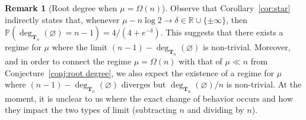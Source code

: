 \documentclass{article}
\newcommand{\pr}{\mathbb{P}}								%
\newcommand{\Prob}[1]{\pr\left(#1\right)}					%
\newcommand{\1}{\mathbbm{1}}								%
\theoremstyle{definition}
\newtheorem{remark}[theorem]{Remark}
\numberwithin{equation}{section}
\newcommand{\R}{\mathbb R}
\begin{document}
\begin{remark}[Root degree when $\mu =\Omega(n)$]
    Observe that Corollary~\ref{cor:star} indirectly states that, whenever $\mu-n \log 2 \to \delta \in \R \cup \{\pm\infty\}$, then $\Prob{\deg_{\mathbf{T}_n}(\varnothing)=n-1}=4/(4+e^{-\delta})$.
    This suggests that there exists a regime for $\mu$ where the limit $(n-1)-\deg_{\mathbf{T}_n}(\varnothing)$ is non-trivial.
    Moreover, and in order to connect the regime $\mu=\Omega(n)$ with that of $\mu\ll n$ from Conjecture~\ref{conj:root degree}, we also expect the existence of a regime for $\mu$ where $(n-1)-\deg_{\mathbf{T}_n}(\varnothing)$ diverges but $\deg_{\mathbf{T}_n}(\varnothing)/n$ is non-trivial.
    At the moment, it is unclear to us where the exact change of behavior occurs and how they impact the two types of limit (subtracting $n$ and dividing by $n$).
\end{remark}
\end{document}
